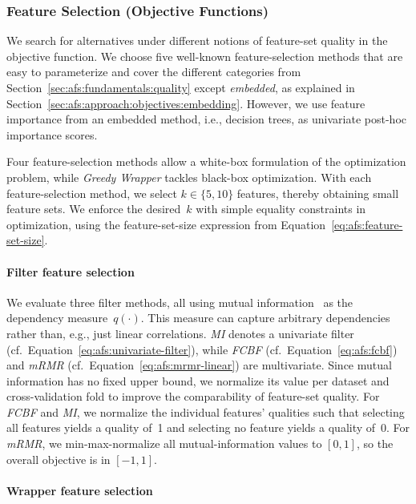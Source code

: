 \documentclass{article}
\theoremstyle{definition}
\begin{document}
\subsubsection{Feature Selection (Objective Functions)}
\label{sec:afs:experimental-design:approaches:feature-selection}

We search for alternatives under different notions of feature-set quality in the objective function.
We choose five well-known feature-selection methods that are easy to parameterize and cover the different categories from Section~\ref{sec:afs:fundamentals:quality} except \emph{embedded}, as explained in Section~\ref{sec:afs:approach:objectives:embedding}.
However, we use feature importance from an embedded method, i.e., decision trees, as univariate post-hoc importance scores.

Four feature-selection methods allow a white-box formulation of the optimization problem, while \emph{Greedy Wrapper} tackles black-box optimization.
With each feature-selection method, we select $k \in \{5,10\}$ features, thereby obtaining small feature sets.
We enforce the desired~$k$ with simple equality constraints in optimization, using the feature-set-size expression from Equation~\ref{eq:afs:feature-set-size}.

\paragraph{Filter feature selection}

We evaluate three filter methods, all using mutual information~\cite{kraskov2004estimating} as the dependency measure~$q(\cdot)$.
This measure can capture arbitrary dependencies rather than, e.g., just linear correlations.
\emph{MI} denotes a univariate filter (cf.~Equation~\ref{eq:afs:univariate-filter}), while \emph{FCBF} (cf.~Equation~\ref{eq:afs:fcbf}) and \emph{mRMR} (cf.~Equation~\ref{eq:afs:mrmr-linear}) are multivariate.
Since mutual information has no fixed upper bound, we normalize its value per dataset and cross-validation fold to improve the comparability of feature-set quality.
For \emph{FCBF} and \emph{MI}, we normalize the individual features' qualities such that selecting all features yields a quality of~1 and selecting no feature yields a quality of~0.
For \emph{mRMR}, we min-max-normalize all mutual-information values to $[0,1]$, so the overall objective is in $[-1,1]$.

\paragraph{Wrapper feature selection}
\end{document}
